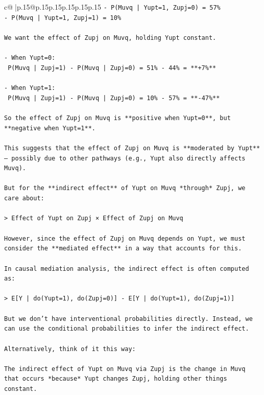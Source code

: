 \documentclass{article}
\begin{document}
{\begin{supertabular}{c@{$\;$}|p{.15\linewidth}@{}p{.15\linewidth}p{.15\linewidth}p{.15\linewidth}p{.15\linewidth}p{.15\linewidth}}
{{{\texttt{{-} P(Muvq | Yupt=1, Zupj=0) = 57\%} \\
\texttt{{-} P(Muvq | Yupt=1, Zupj=1) = 10\%} \\
\\ 
\texttt{We want the effect of Zupj on Muvq, holding Yupt constant.} \\
\\ 
\texttt{{-} When Yupt=0:  } \\
\texttt{  P(Muvq | Zupj=1) {-} P(Muvq | Zupj=0) = 51\% {-} 44\% = **+7\%**} \\
\\ 
\texttt{{-} When Yupt=1:  } \\
\texttt{  P(Muvq | Zupj=1) {-} P(Muvq | Zupj=0) = 10\% {-} 57\% = **{-}47\%**} \\
\\ 
\texttt{So the effect of Zupj on Muvq is **positive when Yupt=0**, but **negative when Yupt=1**.} \\
\\ 
\texttt{This suggests that the effect of Zupj on Muvq is **moderated by Yupt** — possibly due to other pathways (e.g., Yupt also directly affects Muvq).} \\
\\ 
\texttt{But for the **indirect effect** of Yupt on Muvq *through* Zupj, we care about:} \\
\\ 
\texttt{> Effect of Yupt on Zupj × Effect of Zupj on Muvq} \\
\\ 
\texttt{However, since the effect of Zupj on Muvq depends on Yupt, we must consider the **mediated effect** in a way that accounts for this.} \\
\\ 
\texttt{In causal mediation analysis, the indirect effect is often computed as:} \\
\\ 
\texttt{> E{[}Y | do(Yupt=1), do(Zupj=0){]} {-} E{[}Y | do(Yupt=1), do(Zupj=1){]}} \\
\\ 
\texttt{But we don’t have interventional probabilities directly. Instead, we can use the conditional probabilities to infer the indirect effect.} \\
\\ 
\texttt{Alternatively, think of it this way:} \\
\\ 
\texttt{The indirect effect of Yupt on Muvq via Zupj is the change in Muvq that occurs *because* Yupt changes Zupj, holding other things constant.} \\
}}}
\end{supertabular}}
\end{document}
